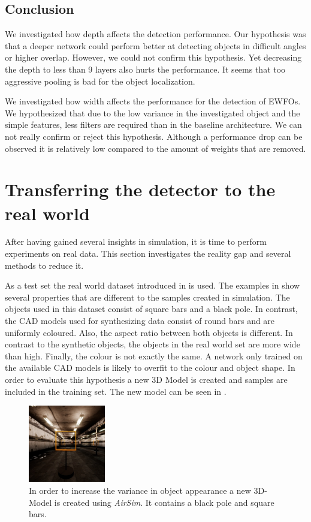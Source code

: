 \subsection{Conclusion}

We investigated how depth affects the detection performance. Our hypothesis was that a deeper network could perform better at detecting objects in difficult angles or higher overlap. However, we could not confirm this hypothesis. Yet decreasing the depth to less than 9 layers also hurts the performance. It seems that too aggressive pooling is bad for the object localization.

We investigated how width affects the performance for the detection of \acp{EWFO}. We hypothesized that due to the low variance in the investigated object and the simple features, less filters are required than in the baseline architecture. We can not really confirm or reject this hypothesis. Although a performance drop can be observed it is relatively low compared to the amount of weights that are removed.


\section{Transferring the detector to the real world}

After having gained several insights in simulation, it is time to perform experiments on real data. This section investigates the reality gap and several methods to reduce it.

As a test set the real world dataset introduced in  is used. The examples in  show several properties that are different to the samples created in simulation. The objects used in this dataset consist of square bars and a black pole. In contrast, the \ac{CAD} models used for synthesizing data consist of round bars and are uniformly coloured. Also, the aspect ratio between both objects is different. In contrast to the synthetic objects, the objects in the real world set are more wide than high. Finally, the colour is not exactly the same. A network only trained on the available \ac{CAD} models is likely to overfit to the colour and object shape. In order to evaluate this hypothesis a new 3D Model is created and samples are included in the training set. The new model can be seen in .

\begin{figure}[hbtp]
	\centering
	\includegraphics[width=0.3\textwidth]{fig/mavlabexample}
	\caption{In order to increase the variance in object appearance a new 3D-Model is created using \textit{AirSim}. It contains a black pole and square bars.}
	\label{fig:mavlabgateexample}
\end{figure}

